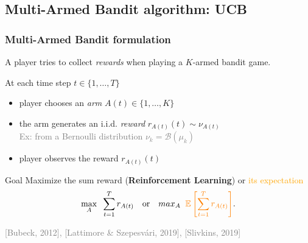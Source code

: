 \subsection{Multi-Armed Bandit algorithm: UCB}

\subsubsection{Multi-Armed Bandit formulation}

\begin{frameO}

    A player tries to collect \emph{rewards} when playing a $K$-armed \slotmachine{} bandit game.

    \begin{lightblock}{}
        At each time step $t\in\{1,\dots,T\}$
        \begin{itemize}
            \item
                player chooses an \emph{arm} \slotmachine{} \(A(t) \in \{1,\dots,K\}\)
            \item
                the arm generates an i.i.d. \emph{reward} $r_{A(t)}(t) \sim \nu_{A(t)}$\\
                \textcolor{gray}{Ex: from a Bernoulli distribution $\nu_{k} = \mathcal{B}(\mu_k)$}
            \item
                player observes the reward $r_{A(t)}(t)$
        \end{itemize}
    \end{lightblock}

    \pause

    \begin{colorblock}{Goal}
        Maximize the sum reward (\textbf{Reinforcement Learning}) or \textcolor{orange}{its expectation}
        \[\max_{A} \;\; \sum\limits_{t=1}^{T} r_{A(t)} \,\,\,\,\,\, \text{or} \,\,\,\,\,\, max_{A} \;\; \textcolor{orange}{ \mathbb{E}\left[\sum\limits_{t=1}^{T} r_{A(t)}\right] }.\]
    \end{colorblock}

    \vfill{}
    \hfill{} {\small \textcolor{gray}{[Bubeck, 2012], [Lattimore \& Szepesvári, 2019], [Slivkins, 2019]}}

\end{frameO}


